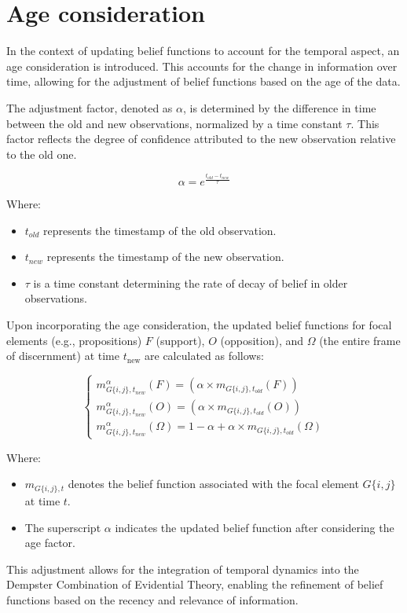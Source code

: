 
\section{Age consideration}

In the context of updating belief functions to account for the temporal aspect, an age consideration is introduced. This accounts for the change in information over time, allowing for the adjustment of belief functions based on the age of the data.

The adjustment factor, denoted as $ \alpha $, is determined by the difference in time between the old and new observations, normalized by a time constant $ \tau $. This factor reflects the degree of confidence attributed to the new observation relative to the old one.

$$
    \alpha = e^{\frac{t_{old}-t_{new}}{\tau}}
$$

Where:
\begin{itemize}
    \item $ t_{old} $ represents the timestamp of the old observation.
    \item $ t_{new} $ represents the timestamp of the new observation.
    \item $ \tau $ is a time constant determining the rate of decay of belief in older observations.
\end{itemize}

Upon incorporating the age consideration, the updated belief functions for focal elements (e.g., propositions) $F$ (support), $O$ (opposition), and $\Omega$ (the entire frame of discernment) at time $ t_{\text{new}} $ are calculated as follows:

$$
    \begin{cases}
        m_{G\{i,j\},t_{new}}^{\alpha}(F) = (\alpha \times m_{G\{i,j\},t_{old}}(F)) \\
        m_{G\{i,j\},t_{new}}^{\alpha}(O) = (\alpha \times m_{G\{i,j\},t_{old}}(O)) \\
        m_{G\{i, j\}, t_{new}}^{\alpha}(\Omega) = 1 - \alpha + \alpha \times m_{G\{i, j\}, t_{old}}(\Omega)
    \end{cases}
$$


Where:
\begin{itemize}
    \item $m_{G\{i,j\},t}$ denotes the belief function associated with the focal element $ G\{i,j\} $ at time $ t $.
    \item The superscript $\alpha$ indicates the updated belief function after considering the age factor.
\end{itemize}


This adjustment allows for the integration of temporal dynamics into the Dempster Combination of Evidential Theory, enabling the refinement of belief functions based on the recency and relevance of information.